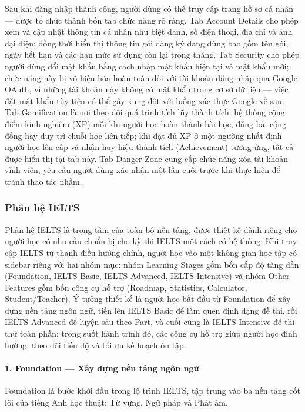 Sau khi đăng nhập thành công, người dùng có thể truy cập trang hồ sơ cá nhân --- được tổ chức thành bốn tab chức năng rõ ràng. Tab Account Details cho phép xem và cập nhật thông tin cá nhân như biệt danh, số điện thoại, địa chỉ và ảnh đại diện; đồng thời hiển thị thông tin gói đăng ký đang dùng bao gồm tên gói, ngày hết hạn và các hạn mức sử dụng còn lại trong tháng. Tab Security cho phép người dùng đổi mật khẩu bằng cách nhập mật khẩu hiện tại và mật khẩu mới; chức năng này bị vô hiệu hóa hoàn toàn đối với tài khoản đăng nhập qua Google OAuth, vì những tài khoản này không có mật khẩu trong cơ sở dữ liệu --- việc đặt mật khẩu tùy tiện có thể gây xung đột với luồng xác thực Google về sau. Tab Gamification là nơi theo dõi quá trình tích lũy thành tích: hệ thống cộng điểm kinh nghiệm (XP) mỗi khi người học hoàn thành bài học, đăng bài cộng đồng hay duy trì chuỗi học liên tiếp; khi đạt đủ XP ở một ngưỡng nhất định người học lên cấp và nhận huy hiệu thành tích (Achievement) tương ứng, tất cả được hiển thị tại tab này. Tab Danger Zone cung cấp chức năng xóa tài khoản vĩnh viễn, yêu cầu người dùng xác nhận một lần cuối trước khi thực hiện để tránh thao tác nhầm.

\subsubsection{Phân hệ IELTS}

Phân hệ IELTS là trọng tâm của toàn bộ nền tảng, được thiết kế dành riêng cho người học có nhu cầu chuẩn bị cho kỳ thi IELTS một cách có hệ thống. Khi truy cập IELTS từ thanh điều hướng chính, người học vào một không gian học tập có sidebar riêng với hai nhóm mục: nhóm Learning Stages gồm bốn cấp độ tăng dần (Foundation, IELTS Basic, IELTS Advanced, IELTS Intensive) và nhóm Other Features gồm bốn công cụ hỗ trợ (Roadmap, Statistics, Calculator, Student/Teacher). Ý tưởng thiết kế là người học bắt đầu từ Foundation để xây dựng nền tảng ngôn ngữ, tiến lên IELTS Basic để làm quen định dạng đề thi, rồi IELTS Advanced để luyện sâu theo Part, và cuối cùng là IELTS Intensive để thi thử toàn phần; trong suốt hành trình đó, các công cụ hỗ trợ giúp người học định hướng, theo dõi tiến độ và tối ưu kế hoạch ôn tập.

\paragraph{1. Foundation --- Xây dựng nền tảng ngôn ngữ}

Foundation là bước khởi đầu trong lộ trình IELTS, tập trung vào ba nền tảng cốt lõi của tiếng Anh học thuật: Từ vựng, Ngữ pháp và Phát âm.

